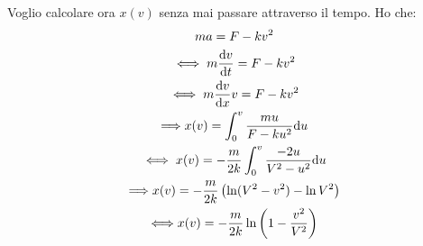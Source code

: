 \documentclass[../main.tex]{subfiles}
\begin{document}
Voglio calcolare ora $x(v)$ senza mai passare attraverso il tempo. Ho che:
\begin{gather*}
	m a=F-kv^2 \\
	\iff m \frac{\mathrm{d} v}{\mathrm{d} t}= F-kv^2 \\
	\iff m \frac{\mathrm{d} v}{\mathrm{d} x} v= F-kv^2 \\
	\Longrightarrow x(v)= \int _0^v \frac{mu}{F-ku^2}\mathrm{d} u \\
	\iff x(v)= -\frac{m}{2k}\int_0^v \frac{-2u}{V^2-u^2} \mathrm{d} u \\
	\Longrightarrow x(v)= -\frac{m}{2k} \left( \ln(V^2-v^2)-\ln V^2 \right) \\
	\Longleftrightarrow x(v)= -\frac{m}{2k}\ln\left (1-\frac{v^2}{V^2}\right)
\end{gather*}
\end{document}
